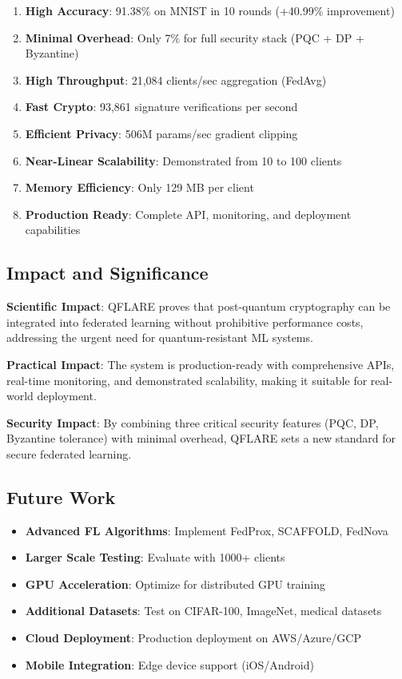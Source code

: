 \documentclass[12pt,a4paper]{article}
\begin{document}
\begin{enumerate}
    \item \textbf{High Accuracy}: 91.38\% on MNIST in 10 rounds (+40.99\% improvement)
    \item \textbf{Minimal Overhead}: Only 7\% for full security stack (PQC + DP + Byzantine)
    \item \textbf{High Throughput}: 21,084 clients/sec aggregation (FedAvg)
    \item \textbf{Fast Crypto}: 93,861 signature verifications per second
    \item \textbf{Efficient Privacy}: 506M params/sec gradient clipping
    \item \textbf{Near-Linear Scalability}: Demonstrated from 10 to 100 clients
    \item \textbf{Memory Efficiency}: Only 129 MB per client
    \item \textbf{Production Ready}: Complete API, monitoring, and deployment capabilities
\end{enumerate}

\subsection{Impact and Significance}

\textbf{Scientific Impact}: QFLARE proves that post-quantum cryptography can be integrated into federated learning without prohibitive performance costs, addressing the urgent need for quantum-resistant ML systems.

\textbf{Practical Impact}: The system is production-ready with comprehensive APIs, real-time monitoring, and demonstrated scalability, making it suitable for real-world deployment.

\textbf{Security Impact}: By combining three critical security features (PQC, DP, Byzantine tolerance) with minimal overhead, QFLARE sets a new standard for secure federated learning.

\subsection{Future Work}

\begin{itemize}
    \item \textbf{Advanced FL Algorithms}: Implement FedProx, SCAFFOLD, FedNova
    \item \textbf{Larger Scale Testing}: Evaluate with 1000+ clients
    \item \textbf{GPU Acceleration}: Optimize for distributed GPU training
    \item \textbf{Additional Datasets}: Test on CIFAR-100, ImageNet, medical datasets
    \item \textbf{Cloud Deployment}: Production deployment on AWS/Azure/GCP
    \item \textbf{Mobile Integration}: Edge device support (iOS/Android)
\end{itemize}
\end{document}
